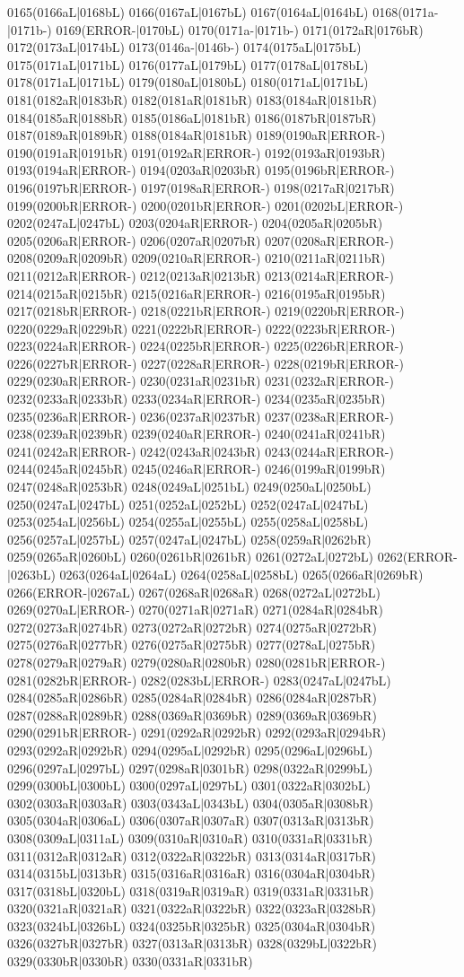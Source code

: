 0165(0166aL|0168bL) 0166(0167aL|0167bL) 0167(0164aL|0164bL) 0168(0171a-|0171b-) 0169(ERROR-|0170bL) 0170(0171a-|0171b-) 0171(0172aR|0176bR) 0172(0173aL|0174bL) 0173(0146a-|0146b-) 0174(0175aL|0175bL) 0175(0171aL|0171bL) 0176(0177aL|0179bL) 0177(0178aL|0178bL) 0178(0171aL|0171bL) 0179(0180aL|0180bL) 0180(0171aL|0171bL) 0181(0182aR|0183bR) 0182(0181aR|0181bR) 0183(0184aR|0181bR) 0184(0185aR|0188bR) 0185(0186aL|0181bR) 0186(0187bR|0187bR) 0187(0189aR|0189bR) 0188(0184aR|0181bR) 0189(0190aR|ERROR-) 0190(0191aR|0191bR) 0191(0192aR|ERROR-) 0192(0193aR|0193bR) 0193(0194aR|ERROR-) 0194(0203aR|0203bR) 0195(0196bR|ERROR-) 0196(0197bR|ERROR-) 0197(0198aR|ERROR-) 0198(0217aR|0217bR) 0199(0200bR|ERROR-) 0200(0201bR|ERROR-) 0201(0202bL|ERROR-) 0202(0247aL|0247bL) 0203(0204aR|ERROR-) 0204(0205aR|0205bR) 0205(0206aR|ERROR-) 0206(0207aR|0207bR) 0207(0208aR|ERROR-) 0208(0209aR|0209bR) 0209(0210aR|ERROR-) 0210(0211aR|0211bR) 0211(0212aR|ERROR-) 0212(0213aR|0213bR) 0213(0214aR|ERROR-) 0214(0215aR|0215bR) 0215(0216aR|ERROR-) 0216(0195aR|0195bR) 0217(0218bR|ERROR-) 0218(0221bR|ERROR-) 0219(0220bR|ERROR-) 0220(0229aR|0229bR) 0221(0222bR|ERROR-) 0222(0223bR|ERROR-) 0223(0224aR|ERROR-) 0224(0225bR|ERROR-) 0225(0226bR|ERROR-) 0226(0227bR|ERROR-) 0227(0228aR|ERROR-) 0228(0219bR|ERROR-) 0229(0230aR|ERROR-) 0230(0231aR|0231bR) 0231(0232aR|ERROR-) 0232(0233aR|0233bR) 0233(0234aR|ERROR-) 0234(0235aR|0235bR) 0235(0236aR|ERROR-) 0236(0237aR|0237bR) 0237(0238aR|ERROR-) 0238(0239aR|0239bR) 0239(0240aR|ERROR-) 0240(0241aR|0241bR) 0241(0242aR|ERROR-) 0242(0243aR|0243bR) 0243(0244aR|ERROR-) 0244(0245aR|0245bR) 0245(0246aR|ERROR-) 0246(0199aR|0199bR) 0247(0248aR|0253bR) 0248(0249aL|0251bL) 0249(0250aL|0250bL) 0250(0247aL|0247bL) 0251(0252aL|0252bL) 0252(0247aL|0247bL) 0253(0254aL|0256bL) 0254(0255aL|0255bL) 0255(0258aL|0258bL) 0256(0257aL|0257bL) 0257(0247aL|0247bL) 0258(0259aR|0262bR) 0259(0265aR|0260bL) 0260(0261bR|0261bR) 0261(0272aL|0272bL) 0262(ERROR-|0263bL) 0263(0264aL|0264aL) 0264(0258aL|0258bL) 0265(0266aR|0269bR) 0266(ERROR-|0267aL) 0267(0268aR|0268aR) 0268(0272aL|0272bL) 0269(0270aL|ERROR-) 0270(0271aR|0271aR) 0271(0284aR|0284bR) 0272(0273aR|0274bR) 0273(0272aR|0272bR) 0274(0275aR|0272bR) 0275(0276aR|0277bR) 0276(0275aR|0275bR) 0277(0278aL|0275bR) 0278(0279aR|0279aR) 0279(0280aR|0280bR) 0280(0281bR|ERROR-) 0281(0282bR|ERROR-) 0282(0283bL|ERROR-) 0283(0247aL|0247bL) 0284(0285aR|0286bR) 0285(0284aR|0284bR) 0286(0284aR|0287bR) 0287(0288aR|0289bR) 0288(0369aR|0369bR) 0289(0369aR|0369bR) 0290(0291bR|ERROR-) 0291(0292aR|0292bR) 0292(0293aR|0294bR) 0293(0292aR|0292bR) 0294(0295aL|0292bR) 0295(0296aL|0296bL) 0296(0297aL|0297bL) 0297(0298aR|0301bR) 0298(0322aR|0299bL) 0299(0300bL|0300bL) 0300(0297aL|0297bL) 0301(0322aR|0302bL) 0302(0303aR|0303aR) 0303(0343aL|0343bL) 0304(0305aR|0308bR) 0305(0304aR|0306aL) 0306(0307aR|0307aR) 0307(0313aR|0313bR) 0308(0309aL|0311aL) 0309(0310aR|0310aR) 0310(0331aR|0331bR) 0311(0312aR|0312aR) 0312(0322aR|0322bR) 0313(0314aR|0317bR) 0314(0315bL|0313bR) 0315(0316aR|0316aR) 0316(0304aR|0304bR) 0317(0318bL|0320bL) 0318(0319aR|0319aR) 0319(0331aR|0331bR) 0320(0321aR|0321aR) 0321(0322aR|0322bR) 0322(0323aR|0328bR) 0323(0324bL|0326bL) 0324(0325bR|0325bR) 0325(0304aR|0304bR) 0326(0327bR|0327bR) 0327(0313aR|0313bR) 0328(0329bL|0322bR) 0329(0330bR|0330bR) 0330(0331aR|0331bR) 